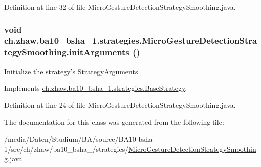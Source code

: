 Definition at line 32 of file MicroGestureDetectionStrategySmoothing.java.\hypertarget{classch_1_1zhaw_1_1ba10__bsha__1_1_1strategies_1_1MicroGestureDetectionStrategySmoothing_ab400617238497ed677884eb5bb7b5782}{
\subsubsection[{initArguments}]{\setlength{\rightskip}{0pt plus 5cm}void ch.zhaw.ba10\_\-bsha\_\-1.strategies.MicroGestureDetectionStrategySmoothing.initArguments ()}}
\label{classch_1_1zhaw_1_1ba10__bsha__1_1_1strategies_1_1MicroGestureDetectionStrategySmoothing_ab400617238497ed677884eb5bb7b5782}
Initialize the strategy's \hyperlink{classch_1_1zhaw_1_1ba10__bsha__1_1_1StrategyArgument}{StrategyArgument}s 

Implements \hyperlink{classch_1_1zhaw_1_1ba10__bsha__1_1_1strategies_1_1BaseStrategy_a0496e8fd0099a5f0f7765322d7e752a9}{ch.zhaw.ba10\_\-bsha\_\-1.strategies.BaseStrategy}.

Definition at line 24 of file MicroGestureDetectionStrategySmoothing.java.

The documentation for this class was generated from the following file:\begin{DoxyCompactItemize}
\item 
/media/Daten/Studium/BA/source/BA10-\/bsha-\/1/src/ch/zhaw/ba10\_\-bsha\_/strategies/\hyperlink{MicroGestureDetectionStrategySmoothing_8java}{MicroGestureDetectionStrategySmoothing.java}\end{DoxyCompactItemize}

